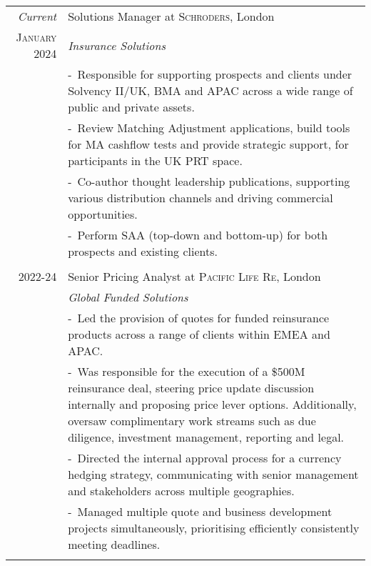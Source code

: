 \documentclass[a4paper,10pt]{article}
\newcommand{\blankline}{\multicolumn{1}{c}{}\\}
\newcommand{\projectitem}{\footnotesize-~\ignorespaces}
\begin{document}
\begin{tabularx}{\textwidth}{@{}r|>{\raggedright\arraybackslash}X@{}}
  \emph{Current} &Solutions Manager at \textsc{Schroders}, London \\
 \textsc{January 2024} & \emph{Insurance Solutions}\\
& \projectitem Responsible for supporting prospects and clients under Solvency II/UK, BMA and APAC across a wide range of public and private assets.\\
 & \projectitem Review Matching Adjustment applications, build tools for MA cashflow tests and provide strategic support, for participants in the UK PRT space.\\
  & \projectitem Co-author thought leadership publications, supporting various distribution channels and driving commercial opportunities. \\
  & \projectitem Perform SAA (top-down and bottom-up) for both prospects and existing clients.\\
  \blankline

\textsc{2022-24} & Senior Pricing Analyst at \textsc{Pacific Life Re}, London \\
 & \emph{Global Funded Solutions}\\
 & \projectitem Led the provision of quotes for funded reinsurance products across a range of clients within EMEA and APAC. \\
  & \projectitem Was responsible for the execution of a \$500M reinsurance deal, steering price update discussion internally and proposing price lever options. Additionally, oversaw complimentary work streams such as due diligence, investment management, reporting and legal.\\
  & \projectitem Directed the internal approval process for a currency hedging strategy, communicating with senior management and stakeholders across multiple geographies. \\
  & \projectitem Managed multiple quote and business development projects simultaneously, prioritising efficiently consistently meeting deadlines.\\
  \blankline


\end{tabularx}
\end{document}
